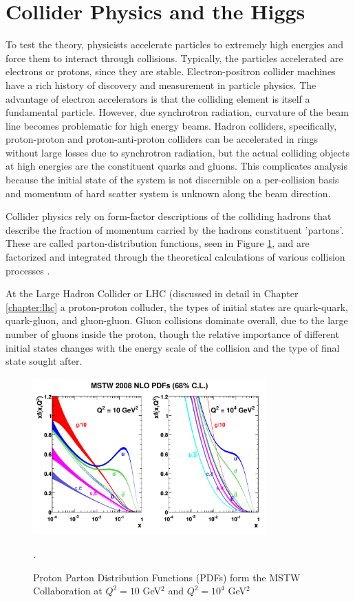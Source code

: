 \section{Collider Physics and the Higgs} 

To test the theory, physicists accelerate particles to extremely high energies and force
them to interact through collisions. Typically, the particles accelerated are
electrons or protons, since they are stable. Electron-positron collider
machines have a rich history of discovery and measurement in particle physics.
The advantage of electron accelerators is that the colliding element is itself
a fundamental particle. However, due synchrotron radiation, curvature of the
beam line becomes problematic for high energy beams.  Hadron colliders,
specifically, proton-proton and proton-anti-proton colliders can be accelerated in rings without large losses
due to synchrotron radiation, but the actual colliding objects at high
energies are the constituent quarks and gluons. This complicates analysis
because the initial state of the system is not discernible on a per-collision
basis and momentum of hard scatter system is unknown along the beam direction.

Collider physics rely on form-factor descriptions of the colliding hadrons
that describe the fraction of momentum carried by the
hadrons constituent 'partons'.  These are called parton-distribution
functions, seen in Figure \ref{figure:theory_pdf}, and are factorized
and integrated through the theoretical calculations of various collision processes \cite{1985.Collins.factorization-theorem}.

At the Large Hadron Collider or LHC (discussed in detail in Chapter \ref{chapter:lhc} a proton-proton colluder,
  the types of initial states are quark-quark, quark-gluon, and gluon-gluon. Gluon collisions dominate overall,
  due to the large number of gluons inside the proton, though the relative importance of different initial states changes with the
  energy scale of the collision and the type of final state sought after.  

\begin{figure}[!t]
\centering 
\includegraphics[width=0.8\textwidth]{figs/mstw2008nlo68cl_allpdfs.pdf}
\caption {Proton Parton Distribution Functions (PDFs) form the MSTW Collaboration at $Q^2 = 10$ GeV$^2$ and $Q^2 = 10^4$ GeV$^2$}.
\label{figure:theory_pdf}
\end{figure}

